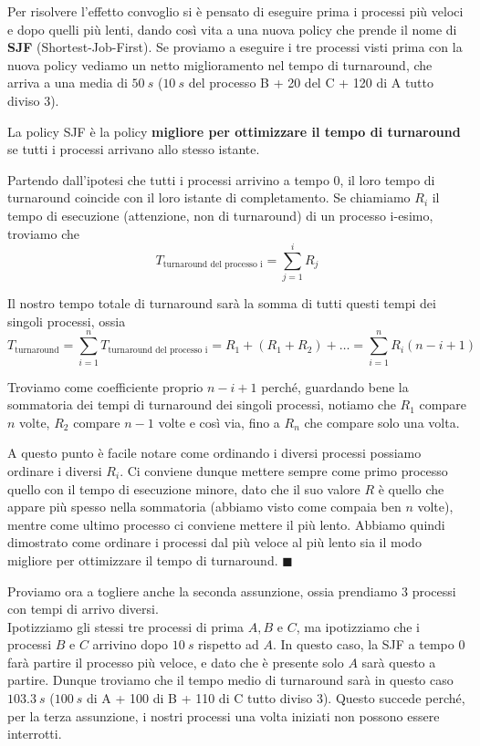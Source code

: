 \documentclass[11pt, a4paper, titlepage, oneside]{scrbook}
\begin{document}
Per risolvere l'effetto convoglio si è pensato di eseguire prima i processi più veloci e dopo quelli più lenti, dando così vita a una nuova policy che prende il nome di \textbf{SJF} (Shortest-Job-First). Se proviamo a eseguire i tre processi visti prima con la nuova policy vediamo un netto miglioramento nel tempo di turnaround, che arriva a una media di \textbf{\boldmath$\SI[reset-math-version=false]{50}{s}$} ($\SI{10}{s}$ del processo B + 20 del C + 120 di A tutto diviso 3).

\begin{Proposizione}[]
\label{propos-SJF}
La policy SJF è la policy \textbf{migliore per ottimizzare il tempo di turnaround} se tutti i processi arrivano allo stesso istante.
\end{Proposizione}

\Dimostrazione \nopagebreak

Partendo dall'ipotesi che tutti i processi arrivino a tempo 0, il loro tempo di turnaround coincide con il loro istante di completamento. Se chiamiamo $R_i$ il tempo di esecuzione (attenzione, non di turnaround) di un processo i-esimo, troviamo che 
\[
T_{\text{turnaround del processo i}} = \sum_{j = 1}^i R_j
\]

Il nostro tempo totale di turnaround sarà la somma di tutti questi tempi dei singoli processi, ossia
\[
T_{\text{turnaround}} = \sum_{i = 1}^n T_{\text{turnaround del processo i}} = R_1 + (R_1 + R_2) + \ldots = \sum_{i = 1}^n R_i (n - i + 1)
\]

\NB Troviamo come coefficiente proprio $n - i + 1$ perché, guardando bene la sommatoria dei tempi di turnaround dei singoli processi, notiamo che $R_1$ compare $n$ volte, $R_2$ compare $n-1$ volte e così via, fino a $R_n$ che compare solo una volta. 

A questo punto è facile notare come ordinando i diversi processi possiamo ordinare i diversi $R_i$. Ci conviene dunque mettere sempre come primo processo quello con il tempo di esecuzione minore, dato che il suo valore $R$ è quello che appare più spesso nella sommatoria (abbiamo visto come compaia ben $n$ volte), mentre come ultimo processo ci conviene mettere il più lento. Abbiamo quindi dimostrato come ordinare i processi dal più veloce al più lento sia il modo migliore per ottimizzare il tempo di turnaround. $\blacksquare$

Proviamo ora a togliere anche la seconda assunzione, ossia prendiamo 3 processi con tempi di arrivo diversi. \\
Ipotizziamo gli stessi tre processi di prima $A, B$ e $C$, ma ipotizziamo che i processi $B$ e $C$ arrivino dopo $\SI{10}{s}$ rispetto ad $A$. In questo caso, la SJF a tempo 0 farà partire il processo più veloce, e dato che è presente solo $A$ sarà questo a partire. Dunque troviamo che il tempo medio di turnaround sarà in questo caso \textbf{\boldmath$\SI[reset-math-version=false]{103.3}{s}$} ($\SI{100}{s}$ di A + 100 di B + 110 di C tutto diviso 3). Questo succede perché, per la terza assunzione, i nostri processi una volta iniziati non possono essere interrotti.
\end{document}
